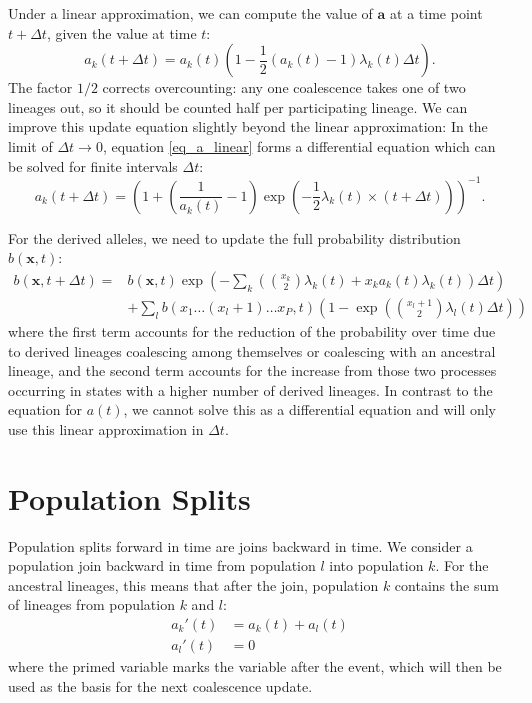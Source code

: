\documentclass[a4paper]{article}
\begin{document}
Under a linear approximation, we can compute the value of $\mathbf{a}$ at a time point $t+\Delta t$, given the value at time $t$:
\begin{equation}
    \label{eq_a_linear}
a_k(t+\Delta t) = a_k(t) \left(1 - \frac{1}{2}(a_k(t) - 1)\lambda_{k}(t) \Delta t\right).
\end{equation}
The factor $1/2$ corrects overcounting: any one coalescence takes one of two lineages out, so it should be counted half per participating lineage. We can improve this update equation slightly beyond the linear approximation: In the limit of $\Delta t \rightarrow 0$, equation \ref{eq_a_linear} forms a differential equation which can be solved for finite intervals $\Delta t$:
\begin{equation}
a_k(t+\Delta t) = \left(1 + \left(\frac{1}{a_k(t)}-1\right) \exp\left(-\frac{1}{2}\lambda_k(t)\times(t+\Delta t)\right)\right)^{-1}.
\end{equation}

For the derived alleles, we need to update the full probability distribution $b(\mathbf{x},t)$:
\begin{equation}
\begin{split}
     b(\mathbf{x}, t+\Delta t) = & b(\mathbf{x}, t) \exp\left( -\sum_k \left(\binom{x_k}{2}\lambda_k(t) +
                         x_k a_k(t) \lambda_k(t)   \right)\Delta t \right)\\
     & + \sum_l b(x_1\ldots (x_l+1)\ldots x_P, t) \left(1-\exp\left(
                     \binom{x_l + 1}{2}\lambda_l(t)\Delta t\right)  \right)
\end{split}
\end{equation}
where the first term accounts for the reduction of the probability over time due to derived lineages coalescing among themselves or coalescing with an ancestral lineage, and the second term accounts for the increase from those two processes occurring in states with a higher number of derived lineages. In contrast to the equation for $a(t)$, we cannot solve this as a differential equation and will only use this linear approximation in $\Delta t$.

\section{Population Splits}
Population splits forward in time are joins backward in time. We consider a population join backward in time from population $l$ into population $k$. For the ancestral lineages, this means that after the join, population $k$ contains the sum of lineages from population $k$ and $l$:
\begin{align}
    a_k'(t) &= a_k(t) + a_l(t)\\
    a_l'(t) &= 0
\end{align}
where the primed variable marks the variable after the event, which will then be used as the basis for the next coalescence update.
\end{document}
